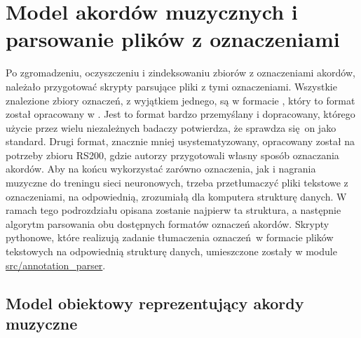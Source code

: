 \section{Model akordów muzycznych i parsowanie plików z oznaczeniami} \label{section:chord_model}

Po zgromadzeniu, oczyszczeniu i zindeksowaniu zbiorów z oznaczeniami akordów, należało przygotować skrypty parsujące pliki z tymi oznaczeniami. Wszystkie znalezione zbiory oznaczeń, z wyjątkiem jednego, są w formacie , który to format został opracowany w \cite{harte_towards_nodate}.  Jest to format bardzo przemyślany i dopracowany, którego użycie przez wielu niezależnych badaczy potwierdza, że sprawdza się on jako standard. Drugi format, znacznie mniej usystematyzowany, opracowany został na potrzeby zbioru RS200, gdzie autorzy przygotowali własny sposób oznaczania akordów. Aby na końcu wykorzystać zarówno oznaczenia, jak i nagrania muzyczne do treningu sieci neuronowych, trzeba przetłumaczyć pliki tekstowe z oznaczeniami, na odpowiednią, zrozumiałą dla komputera strukturę danych. W ramach tego podrozdziału opisana zostanie najpierw ta struktura, a następnie algorytm parsowania obu dostępnych formatów oznaczeń akordów. Skrypty pythonowe, które realizują zadanie tłumaczenia oznaczeń w formacie plików tekstowych na odpowiednią strukturę danych, umieszczone zostały w module \url{src/annotation_parser}.

\subsection{Model obiektowy reprezentujący akordy muzyczne} \label{subsection:chord_model}

